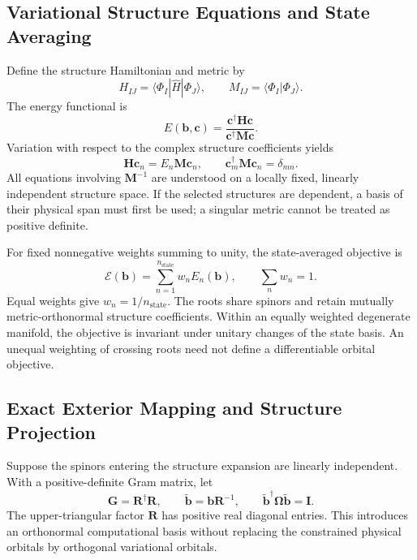 \documentclass[12pt]{article}
\begin{document}
\subsection{Variational Structure Equations and State Averaging}

Define the structure Hamiltonian and metric by
\begin{equation}
 H_{IJ}=\langle\Phi_I|\hat H|\Phi_J\rangle,
 \qquad M_{IJ}=\langle\Phi_I|\Phi_J\rangle.
 \label{eq:structurematrices}
\end{equation}
The energy functional is
\begin{equation}
 E(\mathbf b,\mathbf c)=
 \frac{\mathbf c^\dagger\mathbf H\mathbf c}
      {\mathbf c^\dagger\mathbf M\mathbf c}.
 \label{eq:rayleigh}
\end{equation}
Variation with respect to the complex structure coefficients yields
\begin{equation}
 \mathbf H\mathbf c_n=E_n\mathbf M\mathbf c_n,
 \qquad \mathbf c_m^\dagger\mathbf M\mathbf c_n=\delta_{mn}.
 \label{eq:generalizedeigenproblem}
\end{equation}
All equations involving \(\mathbf M^{-1}\) are understood on a locally fixed, linearly independent structure space. If the selected structures are dependent, a basis of their physical span must first be used; a singular metric cannot be treated as positive definite.

For fixed nonnegative weights summing to unity, the state-averaged objective is
\begin{equation}
 \mathcal E(\mathbf b)=\sum_{n=1}^{n_{\mathrm{state}}}w_nE_n(\mathbf b),
 \qquad \sum_nw_n=1.
 \label{eq:stateaverage}
\end{equation}
Equal weights give \(w_n=1/n_{\mathrm{state}}\). The roots share spinors and retain mutually metric-orthonormal structure coefficients. Within an equally weighted degenerate manifold, the objective is invariant under unitary changes of the state basis. An unequal weighting of crossing roots need not define a differentiable orbital objective.

\subsection{Exact Exterior Mapping and Structure Projection}

Suppose the spinors entering the structure expansion are linearly independent. With a positive-definite Gram matrix, let
\begin{equation}
 \mathbf G=\mathbf R^\dagger\mathbf R,
 \qquad \widetilde{\mathbf b}=\mathbf b\mathbf R^{-1},
 \qquad \widetilde{\mathbf b}^\dagger\boldsymbol\Omega
                  \widetilde{\mathbf b}=\mathbf I.
 \label{eq:orthogonalization}
\end{equation}
The upper-triangular factor \(\mathbf R\) has positive real diagonal entries. This introduces an orthonormal computational basis without replacing the constrained physical orbitals by orthogonal variational orbitals.
\end{document}
